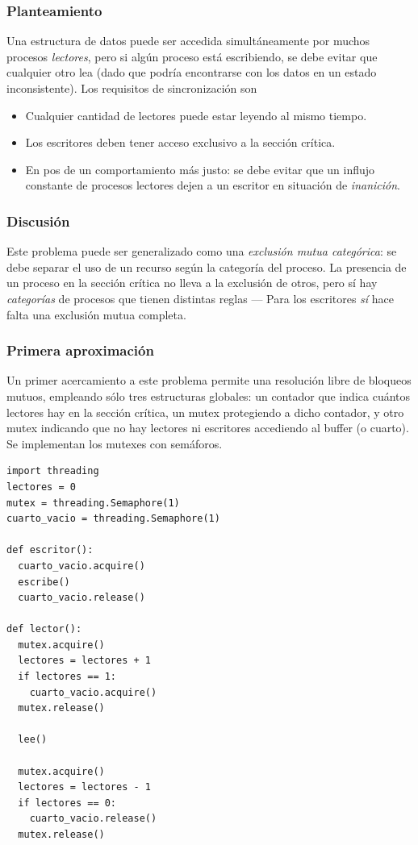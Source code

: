 \documentclass[11pt,fleqn]{book} %
\begin{document}
\subsubsection{Planteamiento}
\label{sec-3-3-6-1}

      Una estructura de datos puede ser accedida simultáneamente por
      muchos procesos \emph{lectores}, pero si algún proceso está
      escribiendo, se debe evitar que cualquier otro lea (dado que
      podría encontrarse con los datos en un estado inconsistente). Los
      requisitos de sincronización son

\begin{itemize}
\item Cualquier cantidad de lectores puede estar leyendo al mismo
       	tiempo.
\item Los escritores deben tener acceso exclusivo a la sección
       	crítica.
\item En pos de un comportamiento más justo: se debe evitar que un
       	influjo constante de procesos lectores dejen a un escritor en
       	situación de \emph{inanición}.
\end{itemize}
\subsubsection{Discusión}
\label{sec-3-3-6-2}


   Este problema puede ser generalizado como una \emph{exclusión mutua    categórica}: se debe separar el uso de un recurso según la categoría
   del proceso. La presencia de un proceso en la sección crítica no
   lleva a la exclusión de otros, pero sí hay \emph{categorías} de procesos
   que tienen distintas reglas — Para los escritores \emph{sí} hace falta
   una exclusión mutua completa.
\subsubsection{Primera aproximación}
\label{sec-3-3-6-3}

   Un primer acercamiento a este problema permite una resolución
   libre de bloqueos mutuos, empleando sólo tres estructuras globales:
   un contador que indica cuántos lectores hay en la sección crítica,
   un mutex protegiendo a dicho contador, y otro mutex indicando que no
   hay lectores ni escritores accediendo al buffer (o
   cuarto). Se implementan los mutexes con semáforos. 


\begin{verbatim}
import threading
lectores = 0
mutex = threading.Semaphore(1)
cuarto_vacio = threading.Semaphore(1)

def escritor():
  cuarto_vacio.acquire()
  escribe()
  cuarto_vacio.release()

def lector():
  mutex.acquire()
  lectores = lectores + 1
  if lectores == 1:
    cuarto_vacio.acquire()
  mutex.release()

  lee()

  mutex.acquire()
  lectores = lectores - 1
  if lectores == 0:
    cuarto_vacio.release()
  mutex.release()
\end{verbatim}
\end{document}

